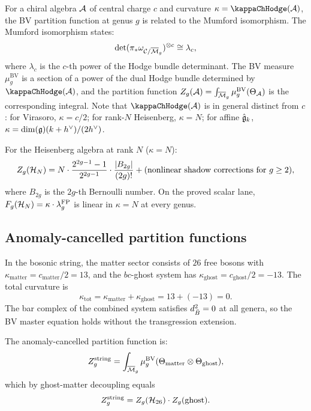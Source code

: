 \begin{construction}
For a chiral algebra $\mathcal{A}$ of central charge $c$ and curvature
$\kappa = \kappaChHodge(\cA)$, the BV partition function at genus $g$ is
related to the Mumford isomorphism. The Mumford isomorphism states:
\[
\det(\pi_* \omega_{\mathcal{C}/\overline{\mathcal{M}}_g})^{\otimes c}
 \cong
 \lambda_c,
\]
where $\lambda_c$ is the $c$-th power of the Hodge bundle determinant.
The BV measure $\mu^{\mathrm{BV}}_g$ is a section of a power of the
dual Hodge bundle determined by $\kappaChHodge(\cA)$, and the partition
function $Z_g(\mathcal{A}) = \int_{\overline{\mathcal{M}}_g}
\mu^{\mathrm{BV}}_g(\Theta_{\mathcal{A}})$ is the corresponding integral.
Note that $\kappaChHodge(\cA)$ is in general distinct from $c$: for Virasoro,
$\kappa = c/2$; for rank-$N$ Heisenberg, $\kappa = N$; for affine
$\hat{\mathfrak{g}}_k$, $\kappa = \dim(\mathfrak{g})(k + h^\vee)/(2h^\vee)$.

For the Heisenberg algebra at rank $N$ ($\kappa = N$):
\[
Z_g(\mathcal{H}_N) = N \cdot
 \frac{2^{2g-1}-1}{2^{2g-1}}\cdot\frac{|B_{2g}|}{(2g)!}
 + \text{(nonlinear shadow corrections for }g \geq 2\text{)},
\]
where $B_{2g}$ is the $2g$-th Bernoulli number. On the proved
scalar lane, $F_g(\mathcal{H}_N) = \kappa \cdot \lambda_g^{\mathrm{FP}}$
is linear in $\kappa = N$ at every genus.
\end{construction}

\subsection{Anomaly-cancelled partition functions}

\begin{proposition}
In the bosonic string, the matter sector consists of $26$ free
bosons with $\kappa_{\mathrm{matter}} = c_{\mathrm{matter}}/2 = 13$,
and the $bc$-ghost system has $\kappa_{\mathrm{ghost}} = c_{\mathrm{ghost}}/2 = -13$.
The total curvature is
\[
\kappa_{\mathrm{tot}} = \kappa_{\mathrm{matter}} + \kappa_{\mathrm{ghost}}
 = 13 + (-13) = 0.
\]
The bar complex of the combined system satisfies $d_{\bar{B}}^2 = 0$ at
all genera, so the BV master equation holds without the transgression
extension.

The anomaly-cancelled partition function is:
\[
Z_g^{\mathrm{string}}
 = \int_{\overline{\mathcal{M}}_g}
 \mu^{\mathrm{BV}}_g(\Theta_{\mathrm{matter}} \otimes
 \Theta_{\mathrm{ghost}}),
\]
which by ghost-matter decoupling equals
\[
Z_g^{\mathrm{string}}
 = Z_g(\mathcal{H}_{26}) \cdot Z_g(\mathrm{ghost}).
\]
\end{proposition}


